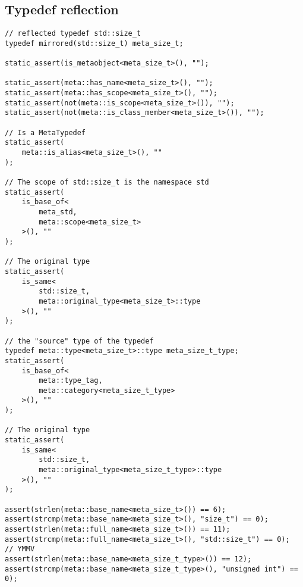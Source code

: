 \subsection{Typedef reflection}

\begin{verbatim}
// reflected typedef std::size_t
typedef mirrored(std::size_t) meta_size_t;

static_assert(is_metaobject<meta_size_t>(), "");

static_assert(meta::has_name<meta_size_t>(), "");
static_assert(meta::has_scope<meta_size_t>(), "");
static_assert(not(meta::is_scope<meta_size_t>()), "");
static_assert(not(meta::is_class_member<meta_size_t>()), "");

// Is a MetaTypedef
static_assert(
	meta::is_alias<meta_size_t>(), ""
);

// The scope of std::size_t is the namespace std
static_assert(
	is_base_of<
		meta_std,
		meta::scope<meta_size_t>
	>(), ""
);

// The original type
static_assert(
	is_same<
		std::size_t,
		meta::original_type<meta_size_t>::type
	>(), ""
);

// the "source" type of the typedef
typedef meta::type<meta_size_t>::type meta_size_t_type;
static_assert(
	is_base_of<
		meta::type_tag,
		meta::category<meta_size_t_type>
	>(), ""
);

// The original type
static_assert(
	is_same<
		std::size_t,
		meta::original_type<meta_size_t_type>::type
	>(), ""
);

assert(strlen(meta::base_name<meta_size_t>()) == 6);
assert(strcmp(meta::base_name<meta_size_t>(), "size_t") == 0);
assert(strlen(meta::full_name<meta_size_t>()) == 11);
assert(strcmp(meta::full_name<meta_size_t>(), "std::size_t") == 0);
// YMMV
assert(strlen(meta::base_name<meta_size_t_type>()) == 12);
assert(strcmp(meta::base_name<meta_size_t_type>(), "unsigned int") == 0);
\end{verbatim}

